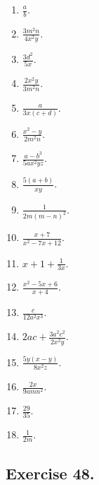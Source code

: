 \documentclass{book}
\begin{document}
\begin{enumerate}
\item $\displaystyle \frac{a}{b}$.

\item $\displaystyle \frac{3m^2 n}{4x^2 y}$.

\item $\displaystyle \frac{3d^2}{5x}$.

\item $\displaystyle \frac{2x^2 y}{3m^2 n}$.

\item $\displaystyle \frac{a}{3x(c+d)}$.

\item $\displaystyle \frac{x^2-y}{2m^2n}$.

\item $\displaystyle \frac{a-b^3}{5ax^2yz}$.

\item $\displaystyle \frac{5(a+b)}{xy}$.

\item $\displaystyle \frac{1}{2m\left(m-n\right)^2}$.

\item $\displaystyle \frac{x+7}{x^2-7x+12}$.

\item $\displaystyle x+1+\frac{1}{3x}$.

\item $\displaystyle \frac{x^2-5x+6}{x+4}$.

\item $\displaystyle \frac{c}{12a^2 x^3}$.

\item $\displaystyle 2ac+\frac{3a^2 c^2}{2x^2 y}$.

\item $\displaystyle \frac{5y(x-y)}{8x^2 z}$.

\item $\displaystyle \frac{2x}{9amn^2}$.

\item $\displaystyle \frac{29}{35}$.

\item $\displaystyle \frac{1}{2m}$.
\end{enumerate}

\subsection*{Exercise 48.}
\end{document}
